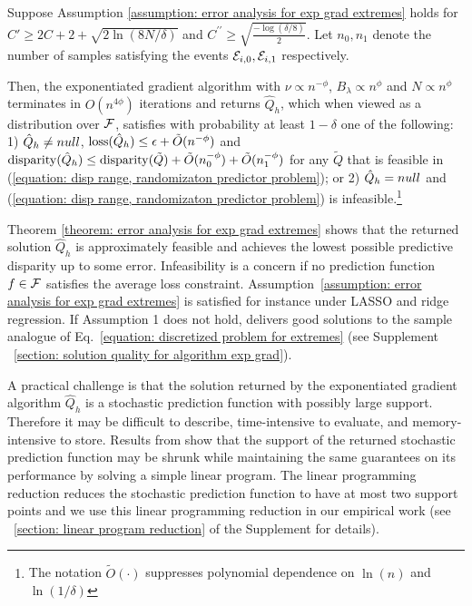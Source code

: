 \documentclass{article}
\begin{document}
\begin{theorem}\label{theorem: error analysis for exp grad extremes}
Suppose Assumption \ref{assumption: error analysis for exp grad extremes} holds for $C' \geq 2C + 2 + \sqrt{2 \ln(8 N/\delta)}$ and $C^{\prime \prime} \geq \sqrt{\frac{-\log(\delta / 8)}{2}}$. Let $n_0, n_1$ denote the number of samples satisfying the events $\mathcal{E}_{i,0}, \mathcal{E}_{i,1}$ respectively.

Then, the exponentiated gradient algorithm with $\nu \propto n^{-\phi}$, $B_\lambda \propto n^\phi$ and $N \propto n^\phi$ terminates in $O(n^{4\phi})$ iterations and returns $\hat{Q}_h$, which when viewed as a distribution over $\mathcal{F}$, satisfies with probability at least $1-\delta$ one of the following: 1) $\hat{Q}_h \neq null$, $\operatorname{loss}(\hat{Q}_h) \leq \epsilon + \tilde{O}(n^{-\phi})$ and $\operatorname{disparity}(\hat{Q}_h) \leq \operatorname{disparity}(\tilde{Q}) + \tilde{O}(n_0^{-\phi}) + \tilde{O}(n_1^{-\phi})$ for any $\tilde{Q}$ that is feasible in (\ref{equation: disp range, randomizaton predictor problem}); or 2) $\hat{Q}_h = null$ and (\ref{equation: disp range, randomizaton predictor problem}) is infeasible.\footnote{The notation $\tilde{O}(\cdot)$ suppresses polynomial dependence on $\ln(n)$ and $\ln(1/\delta)$}
\end{theorem}

Theorem \ref{theorem: error analysis for exp grad extremes} shows that the returned solution $\hat{Q}_h$ is approximately feasible and achieves the lowest possible predictive disparity up to some error. Infeasibility is a concern if no prediction function $f \in \mathcal{F}$ satisfies the average loss constraint. Assumption~\ref{assumption: error analysis for exp grad extremes} is satisfied for instance under LASSO and ridge regression. If Assumption 1 does not hold, \fairs delivers good solutions to the sample analogue of Eq.~\ref{equation: discretized problem for extremes} (see Supplement \textsection~\ref{section: solution quality for algorithm exp grad}).

A practical challenge is that the solution returned by the exponentiated gradient algorithm $\hat{Q}_h$ is a stochastic prediction function with possibly large support. Therefore it may be difficult to describe, time-intensive to evaluate, and memory-intensive to store. Results from \cite{CotterEtAl(19)-ALT} show that the support of the returned stochastic prediction function may be shrunk while maintaining the same guarantees on its performance by solving a simple linear program. 
The linear programming reduction reduces the stochastic prediction function to have at most two support points and we use this linear programming reduction in our empirical work (see \textsection~\ref{section: linear program reduction} of the Supplement for details).
\end{document}
